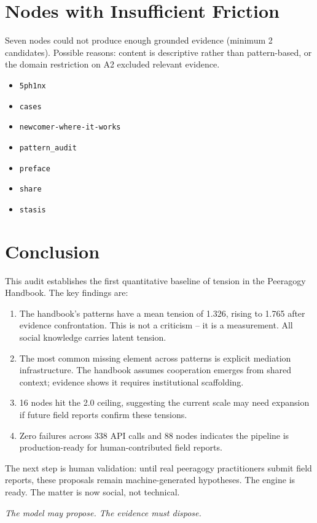 \documentclass[11pt,a4paper]{article}
\begin{document}
\section{Nodes with Insufficient Friction}
Seven nodes could not produce enough grounded evidence (minimum 2 candidates). Possible reasons: content is descriptive rather than pattern-based, or the domain restriction on A2 excluded relevant evidence.

\begin{itemize}
  \item \texttt{5ph1nx}
  \item \texttt{cases}
  \item \texttt{newcomer-where-it-works}
  \item \texttt{pattern\_audit}
  \item \texttt{preface}
  \item \texttt{share}
  \item \texttt{stasis}
\end{itemize}

\section{Conclusion}
This audit establishes the first quantitative baseline of tension in the Peeragogy Handbook. The key findings are:

\begin{enumerate}
  \item The handbook's patterns have a mean tension of 1.326, rising to 1.765 after evidence confrontation. This is not a criticism -- it is a measurement. All social knowledge carries latent tension.
  \item The most common missing element across patterns is explicit mediation infrastructure. The handbook assumes cooperation emerges from shared context; evidence shows it requires institutional scaffolding.
  \item 16 nodes hit the 2.0 ceiling, suggesting the current scale may need expansion if future field reports confirm these tensions.
  \item Zero failures across 338 API calls and 88 nodes indicates the pipeline is production-ready for human-contributed field reports.
\end{enumerate}

The next step is human validation: until real peeragogy practitioners submit field reports, these proposals remain machine-generated hypotheses. The engine is ready. The matter is now social, not technical.

\vspace{1cm}
\noindent\small\textit{The model may propose. The evidence must dispose.}
\end{document}
